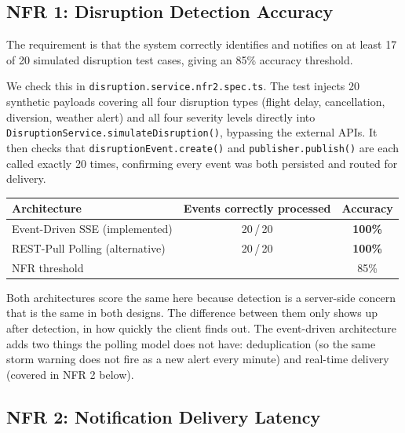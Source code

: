 \documentclass[12pt,a4paper]{article}
\begin{document}
\subsection{NFR 1: Disruption Detection Accuracy}

The requirement is that the system correctly identifies and notifies on at least 17 of 20
simulated disruption test cases, giving an 85\% accuracy threshold.

We check this in \texttt{disruption.service.nfr2.spec.ts}. The test injects 20 synthetic payloads
covering all four disruption types (flight delay, cancellation, diversion, weather alert) and all
four severity levels directly into \texttt{DisruptionService.simulateDisruption()}, bypassing the
external APIs. It then checks that \texttt{disruptionEvent.create()} and
\texttt{publisher.publish()} are each called exactly 20 times, confirming every event was both
persisted and routed for delivery.

\begin{center}
\begin{tabular}{@{}lcc@{}}
\toprule
\textbf{Architecture} & \textbf{Events correctly processed} & \textbf{Accuracy} \\
\midrule
Event-Driven SSE (implemented) & 20\,/\,20 & \textcolor{successgreen}{\textbf{100\%}} \\
REST-Pull Polling (alternative) & 20\,/\,20 & \textcolor{successgreen}{\textbf{100\%}} \\
NFR threshold & & 85\% \\
\bottomrule
\end{tabular}
\end{center}

Both architectures score the same here because detection is a server-side concern that is the
same in both designs. The difference between them only shows up after detection, in how quickly
the client finds out. The event-driven architecture adds two things the polling model does not
have: deduplication (so the same storm warning does not fire as a new alert every minute) and
real-time delivery (covered in NFR 2 below).

\subsection{NFR 2: Notification Delivery Latency}
\end{document}

